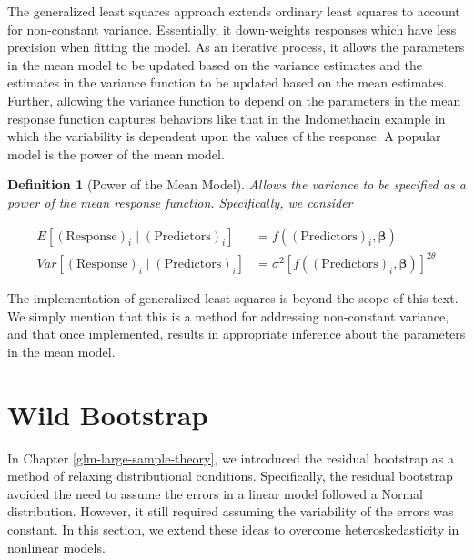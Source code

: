 \documentclass[
]{book}
\theoremstyle{plain}
\theoremstyle{mydefn}
\newtheorem{definition}{Definition}[chapter]
\theoremstyle{myexmpl}
\theoremstyle{remark}
\begin{document}
The generalized least squares approach extends ordinary least squares to account for non-constant variance. Essentially, it down-weights responses which have less precision when fitting the model. As an iterative process, it allows the parameters in the mean model to be updated based on the variance estimates and the estimates in the variance function to be updated based on the mean estimates. Further, allowing the variance function to depend on the parameters in the mean response function captures behaviors like that in the Indomethacin example in which the variability is dependent upon the values of the response. A popular model is the power of the mean model.

\begin{definition}[Power of the Mean Model]
Allows the variance to be specified as a power of the mean response function. Specifically, we consider

\[
\begin{aligned}
  E\left[(\text{Response})_i \mid (\text{Predictors})_i\right]
    &= f\left((\text{Predictors})_i, \boldsymbol{\beta}\right) \\
  Var\left[(\text{Response})_i \mid (\text{Predictors})_i\right]
    &= \sigma^2 \left[f\left((\text{Predictors})_i, \boldsymbol{\beta}\right)\right]^{2\theta}
\end{aligned}
\]
\end{definition}

The implementation of generalized least squares is beyond the scope of this text. We simply mention that this is a method for addressing non-constant variance, and that once implemented, results in appropriate inference about the parameters in the mean model.

\hypertarget{wild-bootstrap}{%
\section{Wild Bootstrap}\label{wild-bootstrap}}

In Chapter \ref{glm-large-sample-theory}, we introduced the residual bootstrap as a method of relaxing distributional conditions. Specifically, the residual bootstrap avoided the need to assume the errors in a linear model followed a Normal distribution. However, it still required assuming the variability of the errors was constant. In this section, we extend these ideas to overcome heteroskedasticity in nonlinear models.
\end{document}
